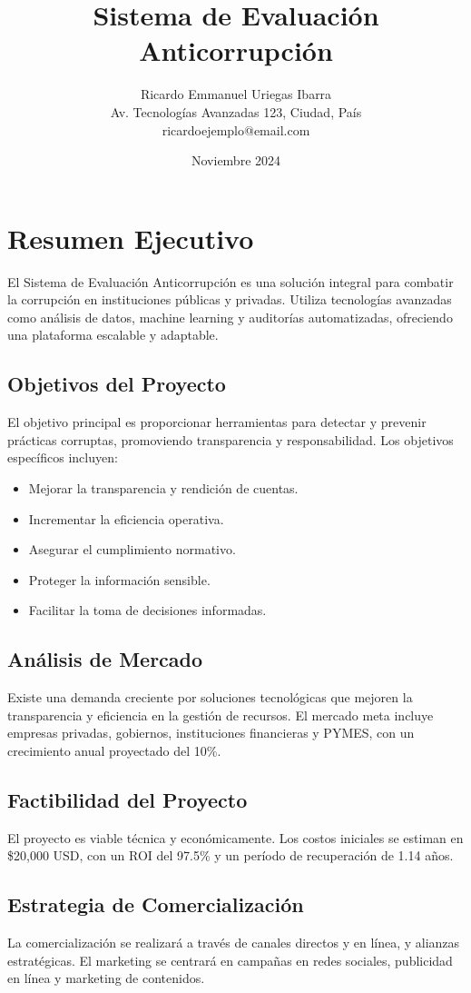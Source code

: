 \documentclass[a4paper,12pt]{article}
\title{\textbf{Sistema de Evaluación Anticorrupción}}
\author{Ricardo Emmanuel Uriegas Ibarra \\ 
Av. Tecnologías Avanzadas 123, Ciudad, País \\ 
ricardoejemplo@email.com}
\date{Noviembre 2024}
\begin{document}

\section{Resumen Ejecutivo}
El Sistema de Evaluación Anticorrupción es una solución integral para combatir la corrupción en instituciones públicas y privadas. Utiliza tecnologías avanzadas como análisis de datos, machine learning y auditorías automatizadas, ofreciendo una plataforma escalable y adaptable.

\subsection*{Objetivos del Proyecto}
El objetivo principal es proporcionar herramientas para detectar y prevenir prácticas corruptas, promoviendo transparencia y responsabilidad. Los objetivos específicos incluyen:

\begin{itemize}
    \item Mejorar la transparencia y rendición de cuentas.
    \item Incrementar la eficiencia operativa.
    \item Asegurar el cumplimiento normativo.
    \item Proteger la información sensible.
    \item Facilitar la toma de decisiones informadas.
\end{itemize}

\subsection*{Análisis de Mercado}
Existe una demanda creciente por soluciones tecnológicas que mejoren la transparencia y eficiencia en la gestión de recursos. El mercado meta incluye empresas privadas, gobiernos, instituciones financieras y PYMES, con un crecimiento anual proyectado del 10\%.

\subsection*{Factibilidad del Proyecto}
El proyecto es viable técnica y económicamente. Los costos iniciales se estiman en \$20,000 USD, con un ROI del 97.5\% y un período de recuperación de 1.14 años.

\subsection*{Estrategia de Comercialización}
La comercialización se realizará a través de canales directos y en línea, y alianzas estratégicas. El marketing se centrará en campañas en redes sociales, publicidad en línea y marketing de contenidos.
\end{document}
